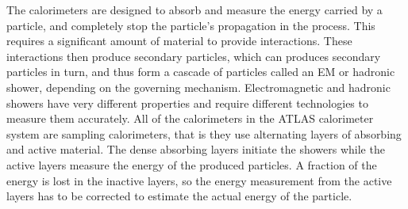 
The calorimeters are designed to absorb and measure the energy carried by a particle, and completely stop the particle's propagation in the process.
This requires a significant amount of material to provide interactions.
These interactions then produce secondary particles, which can produces secondary particles in turn, and thus form a cascade of particles called an \ac{EM} or hadronic shower, depending on the governing mechanism.
Electromagnetic and hadronic showers have very different properties and require different technologies to measure them accurately.
All of the calorimeters in the \ac{ATLAS} calorimeter system are sampling calorimeters, that is they use alternating layers of absorbing and active material.
The dense absorbing layers initiate the showers while the active layers measure the energy of the produced particles.
A fraction of the energy is lost in the inactive layers, so the energy measurement from the active layers has to be corrected to estimate the actual energy of the particle.

